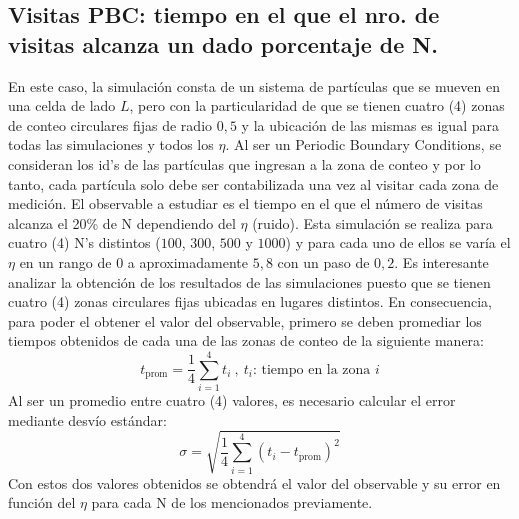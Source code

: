 \documentclass[11pt]{article}
\begin{document}
        \subsection{Visitas PBC: tiempo en el que el nro. de visitas alcanza un dado porcentaje de N.}
            En este caso, la simulación consta de un sistema de partículas que se mueven en una celda de lado $L$,
            pero con la particularidad de que se tienen cuatro (4) zonas de conteo circulares fijas de radio $0,5$ y la
            ubicación de las mismas es igual para todas las simulaciones y todos los $\eta$.
            Al ser un Periodic Boundary Conditions, se consideran los id's de las partículas que ingresan a la zona de
            conteo y por lo tanto, cada partícula solo debe ser contabilizada una vez al visitar cada zona de medición.
            El observable a estudiar es el tiempo en el que el número de visitas alcanza el 20\% de N dependiendo
            del $\eta$ (ruido).
            Esta simulación se realiza para cuatro (4) N's distintos ($100$, $300$, $500$ y $1000$) y para cada uno de ellos
            se varía el $\eta$ en un rango de $0$ a aproximadamente $5,8$ con un paso de $0,2$. Es interesante analizar la
            obtención de los resultados de las simulaciones puesto que se tienen cuatro (4) zonas circulares fijas ubicadas en lugares
            distintos. En consecuencia, para poder el obtener el valor del observable, primero se deben promediar los tiempos obtenidos
            de cada una de las zonas de conteo de la siguiente manera:
            \begin{equation}
                t_{\text{prom}} = \frac{1}{4} \sum_{i=1}^{4} t_i \ ,\ t_i\text{: tiempo en la zona }i
            \end{equation}
            Al ser un promedio entre cuatro (4) valores, es necesario calcular el error mediante desvío estándar:
            \begin{equation}
                \sigma = \sqrt{\frac{1}{4} \sum_{i=1}^{4} (t_i - t_{\text{prom}})^2}
            \end{equation}
            Con estos dos valores obtenidos se obtendrá el valor del observable y su error en función del $\eta$ para cada N de los mencionados previamente.
\end{document}
